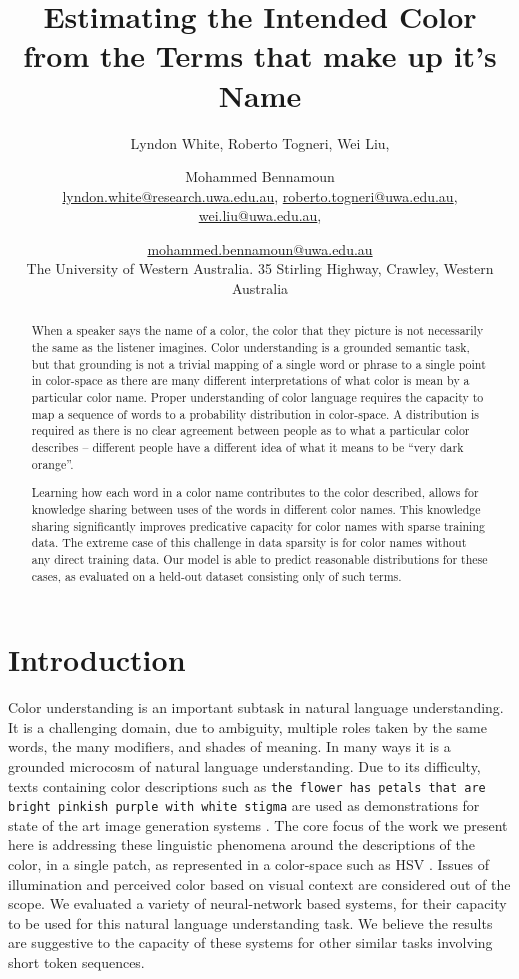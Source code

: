 \documentclass[11pt,a4paper]{article}
\title{Estimating the Intended Color from the Terms that make up it's Name}
\author{Lyndon White, %
	Roberto Togneri, %
	Wei Liu, %
	\and Mohammed Bennamoun%
	\\ 
	\url{lyndon.white@research.uwa.edu.au}, %
	\url{roberto.togneri@uwa.edu.au},\\
	\url{wei.liu@uwa.edu.au}, %
	\and \url{mohammed.bennamoun@uwa.edu.au}%
	\\
	The University of Western Australia.
	35 Stirling Highway, Crawley, Western Australia
}
\newcommand{\parencite}{\citep}
\begin{document}
\maketitle

\begin{abstract}
When a speaker says the name of a color, the color that they picture is not necessarily the same as the listener imagines.
Color understanding is a grounded semantic task, but that grounding is not a trivial mapping of a single word or phrase to a single point in color-space as there are many different interpretations of what  color is mean by a particular color name.
Proper understanding of color language requires the capacity to map a sequence of words to a probability distribution in color-space.
A distribution is required as there is no clear agreement between people as to what a particular color describes -- different people have a different idea of what it means to be ``very dark orange''.

Learning how each word in a color name contributes to the color described,
allows for knowledge sharing between uses of the words in different color names.
This knowledge sharing significantly improves predicative capacity for color names with sparse training data.
The extreme case of this challenge in data sparsity is for color names without any direct training data.
Our model is able to predict reasonable distributions for these cases, as evaluated on a held-out dataset consisting only of such terms.
\end{abstract}

\section{Introduction}\label{sec:intro}

Color understanding is an important subtask in natural language understanding.
It is a challenging domain, due to ambiguity, multiple roles taken by the same words, the many modifiers, and shades of meaning.
In many ways it is a grounded microcosm of natural language understanding.
Due to its difficulty, texts containing color descriptions such as \texttt{the flower has petals that are bright pinkish purple with white stigma} are used as demonstrations for state of the art image generation systems \parencite{reed2016generative, 2015arXiv151102793M}.
The core focus of the work we present here is addressing these linguistic phenomena around the descriptions of the color, in a single patch, as represented in a color-space such as HSV \parencite{smith1978color}.
Issues of illumination and perceived color based on visual context are considered out of the scope.
We evaluated a variety of neural-network based systems, for their capacity to be used for this natural language understanding task.
We believe the results are suggestive to the capacity of these systems for other similar tasks involving short token sequences.
\end{document}
